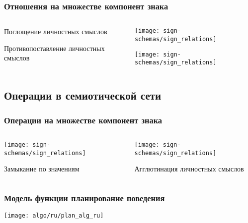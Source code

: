 \documentclass[default]{beamer}
\begin{document}
	\begin{frame}
		\frametitle{Отношения на множестве компонент знака}
		
		\begin{columns}
			\begin{column}{0.3\textwidth}
				\centering
				Поглощение личностных смыслов 
				\par\bigskip
				\par\bigskip
				\par\bigskip
				\par\bigskip
				\par\bigskip
				Противопоставление личностных смыслов 
				
			\end{column}
			\begin{column}{0.7\textwidth}
				\texttt{[image: sign-schemas/sign\_relations]}
				\par\bigskip
				\texttt{[image: sign-schemas/sign\_relations]}
			\end{column}
		\end{columns}
	\end{frame}	

	\subsection{Операции в семиотической сети}	

	\begin{frame}
		\frametitle{Операции на множестве компонент знака}
		
		\begin{columns}
			\begin{column}{0.5\textwidth}
				\centering
				\texttt{[image: sign-schemas/sign\_relations]}
				\par\bigskip
				Замыкание по значениям
			\end{column}
			\begin{column}{0.5\textwidth}
				\centering
				\texttt{[image: sign-schemas/sign\_relations]}
				\par\bigskip
				Агглютинация личностных смыслов
			\end{column}
		\end{columns}
		\nocite{*}
		\printbibliography[keyword={signoper}, resetnumbers=true]
	\end{frame}	
	
	\begin{frame}
		\frametitle{Модель функции планирование поведения}
		\centering
		\texttt{[image: algo/ru/plan\_alg\_ru]}
		\nocite{*}
		\printbibliography[keyword={signb}, resetnumbers=true]
		\nocite{*}
		\printbibliography[keyword={symbsign}, resetnumbers=true]
	\end{frame}	
	
\end{document}
